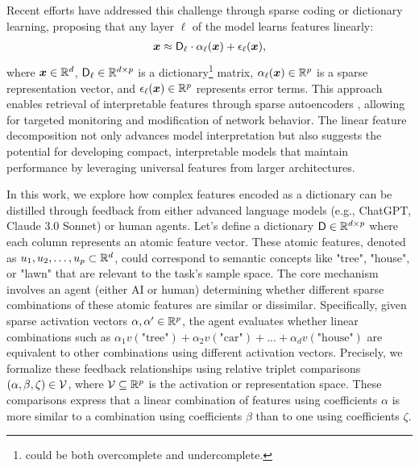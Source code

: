 Recent efforts have addressed this challenge through sparse coding or dictionary learning, proposing that any layer $\ell$ of the model learns features linearly:
\begin{align*}
    {\boldsymbol{x}} \approx \boldsymbol{\textsf{D}}_{\ell}\cdot \alpha_\ell({\boldsymbol{x}}) + \epsilon_{\ell}({\boldsymbol{x}}),
\end{align*}
where ${\boldsymbol{x}} \in \mathbb{R}^d$, $\mathbf{\boldsymbol{\textsf{D}}}_{\ell} \in \mathbb{R}^{d \times p}$ is a dictionary\footnote{could be both overcomplete and undercomplete.} matrix, $\alpha_\ell({\boldsymbol{x}}) \in \mathbb{R}^p$ is a sparse representation vector, and $\epsilon_\ell({\boldsymbol{x}}) \in \mathbb{R}^p$ represents error terms. This approach enables retrieval of interpretable features through sparse autoencoders \citep{bricken2023monosemanticity,huben2024sparse,marks2024sparsefeaturecircuitsdiscovering}, allowing for targeted monitoring and modification of network behavior. The linear feature decomposition not only advances model interpretation but also suggests the potential for developing compact, interpretable models that maintain performance by leveraging universal features from larger architectures.

In this work, we explore how complex features encoded as a dictionary can be distilled through feedback from either advanced language models (e.g., ChatGPT, Claude 3.0 Sonnet) or human agents. Let's define a dictionary $\boldsymbol{\textsf{D}} \in \mathbb{R}^{d \times p}$ where each column represents an atomic feature vector. These atomic features, denoted as ${u_1, u_2, \ldots, u_p} \subset \mathbb{R}^d$, could correspond to semantic concepts like "tree", "house", or "lawn" that are relevant to the task's sample space.
The core mechanism involves an agent (either AI or human) determining whether different sparse combinations of these atomic features are similar or dissimilar. Specifically, given sparse activation vectors $\alpha, \alpha' \in \mathbb{R}^p$, the agent evaluates whether linear combinations such as $\alpha_1 v(\text{"tree"}) + \alpha_2 v(\text{"car"}) + ... + \alpha_d v(\text{"house"})$ are equivalent to other combinations using different activation vectors.
Precisely, we formalize these feedback relationships using relative triplet comparisons $(\alpha, \beta, \zeta) \in {\mathcal{V}}$, where ${\mathcal{V}} \subseteq \mathbb{R}^p$ is the activation or representation space. These comparisons express that a linear combination of features using coefficients $\alpha$ is more similar to a combination using coefficients $\beta$ than to one using coefficients $\zeta$.

